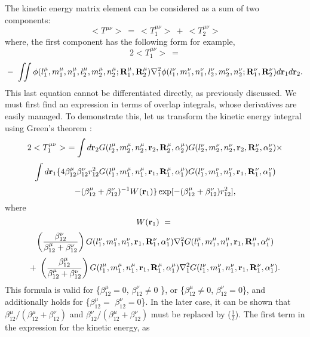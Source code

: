 The kinetic energy matrix element can be considered as a sum of two
components: 
\begin{equation}
<T^{\mu \nu }>\ =\ <T_1^{\mu \nu }>\ +\ <T_2^{\mu \nu }>
\end{equation}
where, the first component has the following form for example, 
\[
2<T_1^{\mu \nu }>\ =
\]
\begin{equation}
-\ \int \!\!\!\int \phi (l_1^\mu ,m_1^\mu ,n_1^\mu ,l_2^\mu ,m_2^\mu
,n_2^\mu ;{\bf R}_1^\mu ,{\bf R}_2^\mu ){\nabla _1^2}\phi (l_1^\nu ,m_1^\nu
,n_1^\nu ,l_2^\nu ,m_2^\nu ,n_2^\nu ;{\bf R}_1^\nu ,{\bf R}_2^\nu )d{\bf r}%
_1d{\bf r}_2.
\end{equation}
This last equation cannot be differentiated directly, as previously
discussed. We must first find an expression in terms of overlap integrals,
whose derivatives are easily managed. To demonstrate this, let us transform
the kinetic energy integral using Green's theorem \cite{les64}: 
\[
2<T_1^{\mu \nu }>\ =\int d{\bf r}_2G(l_2^\mu ,m_2^\mu ,n_2^\mu ,{\bf r}_2,%
{\bf R}_2^\mu ,\alpha _2^\mu )G(l_2^\nu ,m_2^\nu ,n_2^\nu ,{\bf r}_2,{\bf R}%
_2^\nu ,\alpha _2^\nu )\times 
\]
\[
\int d{\bf r}_1\{4\beta _{12}^\mu \beta _{12}^\nu r_{12}^2G(l_1^\mu ,m_1^\mu
,n_1^\mu ,{\bf r}_1,{\bf R}_1^\mu ,\alpha _1^\mu )G(l_1^\nu ,m_1^\nu
,n_1^\nu ,{\bf r}_1,{\bf R}_1^\nu ,\alpha _1^\nu )
\]
\begin{equation}
-(\beta _{12}^\mu +\beta _{12}^\nu )^{-1}W({\bf r}_1)\}\exp [-(\beta
_{12}^\mu +\beta _{12}^\nu )r_{12}^2],
\end{equation}
where 
\[
W({\bf r}_1)\ =\ 
\]
\[
\left( \frac{\beta _{12}^\nu }{\beta _{12}^\mu +\beta _{12}^\nu }\right)
G(l_1^\nu ,m_1^\nu ,n_1^\nu ,{\bf r}_1,{\bf R}_1^\nu ,\alpha _1^\nu ){\nabla
_1^2}G(l_1^\mu ,m_1^\mu ,n_1^\mu ,{\bf r}_1,{\bf R}_1^\mu ,\alpha _1^\mu )
\]
\begin{equation}
+\ \left( \frac{\beta _{12}^\mu }{\beta _{12}^\mu +\beta _{12}^\nu }\right)
G(l_1^\mu ,m_1^\mu ,n_1^\mu ,{\bf r}_1,{\bf R}_1^\mu ,\alpha _1^\mu ){\nabla
_1^2}G(l_1^\nu ,m_1^\nu ,n_1^\nu ,{\bf r}_1,{\bf R}_1^\nu ,\alpha _1^\nu ).
\end{equation}
This formula is valid for \{$\beta _{12}^\mu =0$, $\beta _{12}^\nu \neq 0$%
\}, or \{$\beta _{12}^\mu \neq 0$, $\beta _{12}^\nu =0$\}, and additionally
holds for \{$\beta _{12}^\mu =$ $\beta _{12}^\nu =0$\}. In the later case,
it can be shown that $\beta _{12}^\mu /(\beta _{12}^\mu +\beta _{12}^\nu )$
and $\beta _{12}^\nu /(\beta _{12}^\mu +\beta _{12}^\nu )$ must be replaced
by ($\frac 12$). The first term in the expression for the kinetic energy, as
